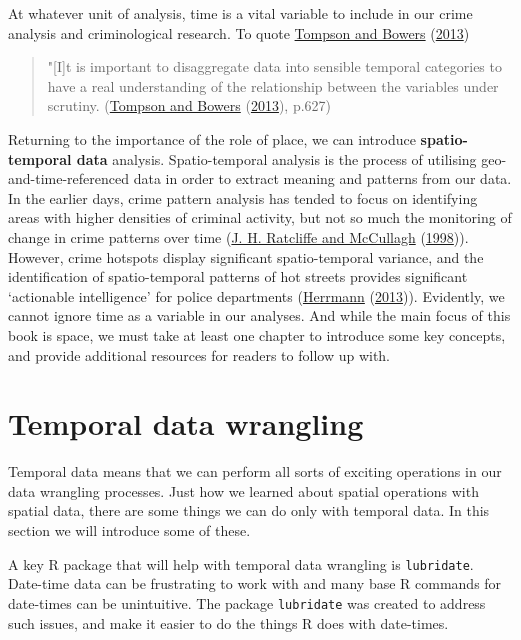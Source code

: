 \documentclass[
]{book}
\begin{document}
At whatever unit of analysis, time is a vital variable to include in our crime analysis and criminological research. To quote \protect\hyperlink{ref-Tompson_2013}{Tompson and Bowers} (\protect\hyperlink{ref-Tompson_2013}{2013})

\begin{quote}
"{[}I{]}t is important to disaggregate data into sensible temporal categories to have a real understanding of the relationship between the variables under scrutiny. (\protect\hyperlink{ref-Tompson_2013}{Tompson and Bowers} (\protect\hyperlink{ref-Tompson_2013}{2013}), p.627)
\end{quote}

Returning to the importance of the role of place, we can introduce \textbf{spatio-temporal data} analysis. Spatio-temporal analysis is the process of utilising geo-and-time-referenced data in order to extract meaning and patterns from our data. In the earlier days, crime pattern analysis has tended to focus on identifying areas with higher densities of criminal activity, but not so much the monitoring of change in crime patterns over time (\protect\hyperlink{ref-Ratcliffe_1998}{J. H. Ratcliffe and McCullagh} (\protect\hyperlink{ref-Ratcliffe_1998}{1998})). However, crime hotspots display significant spatio-temporal variance, and the identification of spatio-temporal patterns of hot streets provides significant `actionable intelligence' for police departments (\protect\hyperlink{ref-Herrmann_2013}{Herrmann} (\protect\hyperlink{ref-Herrmann_2013}{2013})). Evidently, we cannot ignore time as a variable in our analyses. And while the main focus of this book is space, we must take at least one chapter to introduce some key concepts, and provide additional resources for readers to follow up with.

\hypertarget{temporal-data-wrangling}{%
\section{Temporal data wrangling}\label{temporal-data-wrangling}}

Temporal data means that we can perform all sorts of exciting operations in our data wrangling processes. Just how we learned about spatial operations with spatial data, there are some things we can do only with temporal data. In this section we will introduce some of these.

A key R package that will help with temporal data wrangling is \texttt{lubridate}. Date-time data can be frustrating to work with and many base R commands for date-times can be unintuitive. The package \texttt{lubridate} was created to address such issues, and make it easier to do the things R does with date-times.
\end{document}
